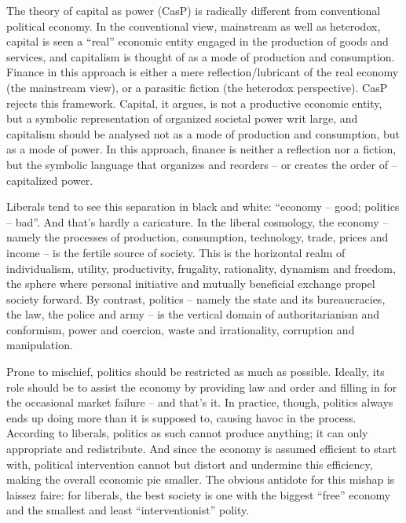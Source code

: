 \documentclass[
]{book}
\begin{document}
The theory of capital as power (CasP) is radically different from conventional political
economy.
In the conventional view, mainstream as well as heterodox, capital is seen a ``real'' economic
entity engaged in the production of goods and services, and capitalism is thought of as a
mode of production and consumption. Finance in this approach is either a mere
reflection/lubricant of the real economy (the mainstream view), or a parasitic fiction (the
heterodox perspective).
CasP rejects this framework. Capital, it argues, is not a productive economic entity, but a
symbolic representation of organized societal power writ large, and capitalism should be
analysed not as a mode of production and consumption, but as a mode of power. In this
approach, finance is neither a reflection nor a fiction, but the symbolic language that
organizes and reorders -- or creates the order of -- capitalized power.

Liberals tend to see this separation in black and white: ``economy -- good; politics -- bad''. And
that's hardly a caricature. In the liberal cosmology, the economy -- namely the processes of
production, consumption, technology, trade, prices and income -- is the fertile source of
society. This is the horizontal realm of individualism, utility, productivity, frugality, rationality,
dynamism and freedom, the sphere where personal initiative and mutually beneficial
exchange propel society forward. By contrast, politics -- namely the state and its
bureaucracies, the law, the police and army -- is the vertical domain of authoritarianism and
conformism, power and coercion, waste and irrationality, corruption and manipulation.

Prone to mischief, politics should be restricted as much as possible. Ideally, its role should be
to assist the economy by providing law and order and filling in for the occasional market
failure -- and that's it. In practice, though, politics always ends up doing more than it is
supposed to, causing havoc in the process. According to liberals, politics as such cannot
produce anything; it can only appropriate and redistribute. And since the economy is assumed
efficient to start with, political intervention cannot but distort and undermine this efficiency,
making the overall economic pie smaller. The obvious antidote for this mishap is laissez faire:
for liberals, the best society is one with the biggest ``free'' economy and the smallest and least
``interventionist'' polity.
\end{document}
